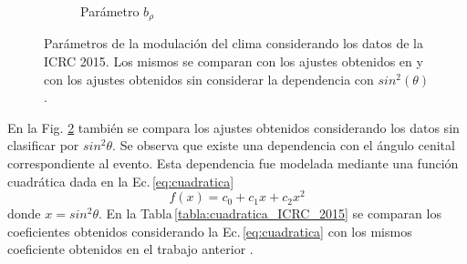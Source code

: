 \begin{figure}[H]
\begin{subfigure}[b]{\textwidth}
						\caption{Parámetro  $b_{\rho}$	 }
						\label{fig:brho_2015}
        				\end{subfigure}%
        				\caption{Parámetros de la modulación del clima considerando los datos de la ICRC 2015. Los mismos se comparan con los ajustes obtenidos en \cite{aab2017impact} y con los ajustes obtenidos sin considerar la dependencia con $sin^2(\theta)$. }\label{fig:parameters_old}
					\end{figure}
				En la Fig. \ref{fig:parameters_old} también se compara los ajustes obtenidos considerando los datos sin clasificar por $sin^2\theta$. Se observa que existe una dependencia con el ángulo cenital correspondiente al evento. Esta dependencia fue modelada mediante una función cuadrática dada en la Ec.\,\ref{eq:cuadratica}
				\begin{equation}
					f(x) = c_0 + c_1x + c_2x^2
					\label{eq:cuadratica}
				\end{equation}
				donde $x=sin^2\theta$.  En la Tabla\,\ref{tabla:cuadratica_ICRC_2015} se comparan los coeficientes obtenidos considerando la Ec.\,\ref{eq:cuadratica} con los mismos coeficiente obtenidos en el trabajo anterior \cite{aab2017impact}. 

